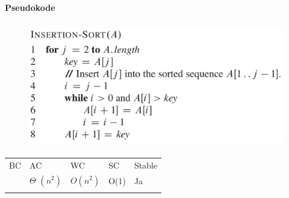 \documentclass[12pt]{report}
\begin{document}
\par

\paragraph*{Pseudokode}



\begin{figure}[H]
	\begin{Center}
		\includegraphics[width=4.63in,height=2.12in]{./media/image34.png}
	\end{Center}
\end{figure}



\par





\begin{table}[H]
 			\centering
\begin{tabular}{p{1.01in}p{1.26in}p{1.23in}p{1.0in}p{1.18in}}
\hline
\multicolumn{1}{p{1.01in}}{{\fontsize{13pt}{15.6pt}\selectfont BC}} & 
\multicolumn{1}{p{1.26in}}{{\fontsize{13pt}{15.6pt}\selectfont AC}} & 
\multicolumn{1}{p{1.23in}}{{\fontsize{13pt}{15.6pt}\selectfont WC}} & 
\multicolumn{1}{p{1.0in}}{{\fontsize{13pt}{15.6pt}\selectfont SC}} & 
\multicolumn{1}{p{1.18in}}{{\fontsize{13pt}{15.6pt}\selectfont Stable}} \\
\hhline{-----}
\multicolumn{1}{p{1.01in}}{{\fontsize{14pt}{16.8pt}\selectfont $ \Omega $ (n)}} & 
\multicolumn{1}{p{1.26in}}{{\fontsize{14pt}{16.8pt}\selectfont $ \Theta $  \(  \left( n^{2} \right)  \) }} & 
\multicolumn{1}{p{1.23in}}{ \( O \left( n^{2} \right)  \) } & 
\multicolumn{1}{p{1.0in}}{{\fontsize{14pt}{16.8pt}\selectfont O(1)}} & 
\multicolumn{1}{p{1.18in}}{{\fontsize{13pt}{15.6pt}\selectfont Ja}} \\
\hhline{-----}

\end{tabular}
 \end{table}
\end{document}

